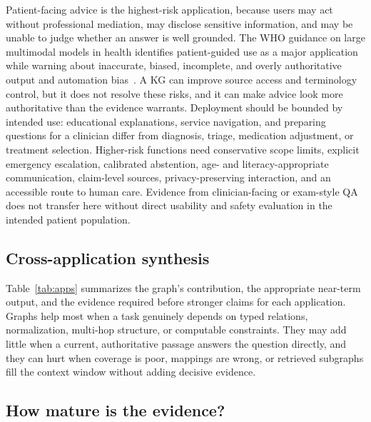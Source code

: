 Patient-facing advice is the highest-risk application, because users may act without professional mediation, may disclose sensitive information, and may be unable to judge whether an answer is well grounded. The WHO guidance on large multimodal models in health identifies patient-guided use as a major application while warning about inaccurate, biased, incomplete, and overly authoritative output and automation bias~\cite{who2024lmm}. A KG can improve source access and terminology control, but it does not resolve these risks, and it can make advice look more authoritative than the evidence warrants. Deployment should be bounded by intended use: educational explanations, service navigation, and preparing questions for a clinician differ from diagnosis, triage, medication adjustment, or treatment selection. Higher-risk functions need conservative scope limits, explicit emergency escalation, calibrated abstention, age- and literacy-appropriate communication, claim-level sources, privacy-preserving interaction, and an accessible route to human care. Evidence from clinician-facing or exam-style QA does not transfer here without direct usability and safety evaluation in the intended patient population.

\subsection{Cross-application synthesis}

Table~\ref{tab:apps} summarizes the graph's contribution, the appropriate near-term output, and the evidence required before stronger claims for each application. Graphs help most when a task genuinely depends on typed relations, normalization, multi-hop structure, or computable constraints. They may add little when a current, authoritative passage answers the question directly, and they can hurt when coverage is poor, mappings are wrong, or retrieved subgraphs fill the context window without adding decisive evidence.

\subsection{How mature is the evidence?}
\label{sec:maturity}

